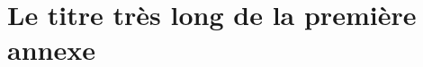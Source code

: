 \documentclass[12pt,twoside]{book}
\begin{document}
\appendix %

\chapter[Titre court]{Le titre très long de la première annexe}

%

\newpage{\pagestyle{empty}\cleardoublepage}


\backmatter %

\tableofcontents
\end{document}
